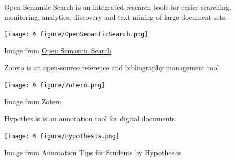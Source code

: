 \documentclass[unknownkeysallowed,usepdftitle=false, parskip=full, aspectratio-1610]{beamer}
\newcommand{\secvariable}{nothing}
\newcommand{\mysection}[1]{\renewcommand{\secvariable}{#1}
}
\begin{document}
\mysection{major}
\begin{frame}\label{\secvariable} %

Open Semantic Search is an integrated research tools for easier searching, monitoring, analytics, discovery and text mining of large document sets.
  \vspace{0.5cm}

\texttt{[image: \%
figure/OpenSemanticSearch.png]}  

\tiny Image from \href{https://www.opensemanticsearch.org/doc/search}{Open Semantic Search}

\end{frame}

\mysection{slab}
\begin{frame}\label{\secvariable}

Zotero is an open-source reference and bibliography management tool.
  \vspace{0.5cm}

\texttt{[image: \%
figure/Zotero.png]}

\tiny Image from \href{https://www.zotero.org/}{Zotero}


\end{frame}





\mysection{minor}
\begin{frame}\label{\secvariable} %

Hypothes.is is an annotation tool for digital documents.
  \vspace{0.5cm}

\texttt{[image: \%
figure/Hypothesis.png]}

\tiny Image from \href{https://web.hypothes.is/annotation-tips-for-students/}{Annotation Tips} for Students by Hypothes.is 

\end{frame}
\end{document}

